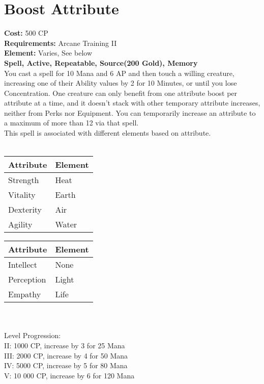 \section{Boost Attribute}
\textbf{Cost:} 500 CP\\
\textbf{Requirements:} Arcane Training II\\
\textbf{Element:} Varies, See below\\
\textbf{Spell, Active, Repeatable, Source(200 Gold), Memory}\\
You cast a spell for 10 Mana and 6 AP and then touch a willing creature, increasing one of their Ability values by 2 for 10 Minutes, or until you lose Concentration. One creature can only benefit from one attribute boost per attribute at a time, and it doesn’t stack with other temporary attribute increases, neither from Perks nor Equipment. You can temporarily increase an attribute to a maximum of more than 12 via that spell.\\
This spell is associated with different elements based on attribute.\\
\\
\begin{minipage}{0.5\textwidth}
	\begin{tabular}{l | l} 
		Attribute & Element\\ \hline
		Strength & Heat\\
		Vitality & Earth\\
		Dexterity & Air\\
		Agility & Water\\
	\end{tabular}
\end{minipage}
\begin{minipage}{0.5\textwidth}
	\begin{tabular}{l | l}
		Attribute & Element\\ \hline
		Intellect & None\\
		Perception & Light\\
		Empathy & Life\\
	\end{tabular}
\end{minipage}
\\
\\
Level Progression:\\
II: 1000 CP, increase by 3 for 25 Mana\\
III: 2000 CP, increase by 4 for 50 Mana\\
IV: 5000 CP, increase by 5 for 80 Mana\\
V: 10 000 CP, increase by 6 for 120 Mana\\